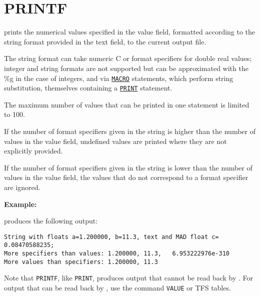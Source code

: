 \section{PRINTF}
\label{sec:printf}
prints the numerical values specified in the value field, formatted
according to the string format provided in the text field, to the
current output file.  

The string format can take numeric C or \madx format specifiers for
double real values; integer and string formats are not supported but 
can be approximated with the \%g in the case of integers, and via
\hyperref[sec:macro]{\tt MACRO} statements, which perform string
substitution, themselves containing a \hyperref[sec:print]{\tt PRINT}
statement.  

The maximum number of values that can be printed in one
statement is limited to 100. 

If the number of format specifiers given in the string is higher 
than the number of values in the value field, undefined values are printed 
where they are not explicitly provided. 

If the number of format specifiers given in the string is lower 
than the number of values in the value field, the values that 
do not correspond to a format specifier are ignored. 


{\bf Example:}

produces the following output:
\begin{verbatim}
String with floats a=1.200000, b=11.3, text and MAD float c=     0.08470588235;
More specifiers than values: 1.200000, 11.3,   6.953222976e-310
More values than specifiers: 1.200000, 11.3
\end{verbatim}

Note that {\tt PRINTF}, like {\tt PRINT}, produces output that
cannot be read back by \madx. For output that can be read back by \madx,
use the command {\tt VALUE} or TFS tables.

